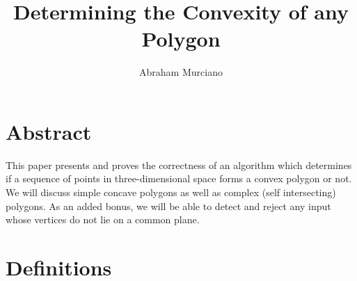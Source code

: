 \documentclass{article}
\title{Determining the Convexity of any Polygon}
\author{Abraham Murciano}
\begin{document}
\maketitle

\section{Abstract}

This paper presents and proves the correctness of an algorithm which determines if a sequence of points in three-dimensional space forms a convex polygon or not. We will discuss simple concave polygons as well as complex (self intersecting) polygons. As an added bonus, we will be able to detect and reject any input whose vertices do not lie on a common plane.

\section{Definitions}
\end{document}
